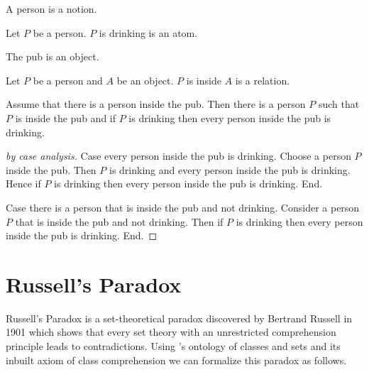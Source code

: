 \documentclass{article}
\begin{document}
  \begin{forthel}
    \begin{signature*}
      A person is a notion.
    \end{signature*}

    \begin{signature*}
      Let $P$ be a person.
      $P$ is drinking is an atom.
    \end{signature*}

    \begin{signature*}
      The pub is an object.
    \end{signature*}

    \begin{signature*}
      Let $P$ be a person and $A$ be an object.
      $P$ is inside $A$ is a relation.
    \end{signature*}

    \begin{theorem*}
      Assume that there is a person inside the pub.
      Then there is a person $P$ such that $P$ is inside the pub and if $P$ is
      drinking then every person inside the pub is drinking.
    \end{theorem*}
    \begin{proof}[by case analysis]
      Case every person inside the pub is drinking.
        Choose a person $P$ inside the pub.
        Then $P$ is drinking and every person inside the pub is drinking.
        Hence if $P$ is drinking then every person inside the pub is drinking.
      End.

      Case there is a person that is inside the pub and not drinking.
        Consider a person $P$ that is inside the pub and not drinking.
        Then if $P$ is drinking then every person inside the pub is drinking.
      End.
    \end{proof}
  \end{forthel}


  \section*{Russell's Paradox}

  Russell's Paradox is a set-theoretical paradox discovered by Bertrand Russell
  in 1901 which shows that every set theory with an unrestricted comprehension
  principle leads to contradictions.
  Using \Naproche's ontology of classes and sets and its inbuilt axiom of class
  comprehension we can formalize this paradox as follows.
\end{document}
